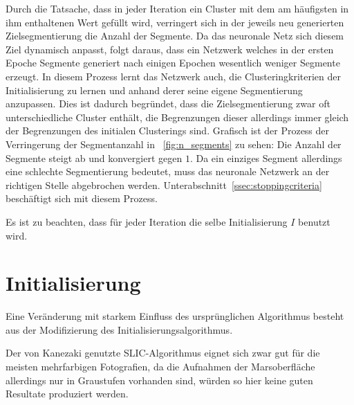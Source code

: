 Durch die Tatsache, dass in jeder Iteration ein Cluster mit dem am häufigsten in ihm enthaltenen Wert gefüllt wird, verringert sich in der jeweils neu generierten Zielsegmentierung die Anzahl der Segmente. Da das neuronale Netz sich diesem Ziel dynamisch anpasst, folgt daraus, dass ein Netzwerk welches in der ersten Epoche  Segmente generiert nach einigen Epochen wesentlich weniger Segmente erzeugt. In diesem Prozess lernt das Netzwerk auch, die Clusteringkriterien der Initialisierung zu lernen und anhand derer seine eigene Segmentierung anzupassen. Dies ist dadurch begründet, dass die Zielsegmentierung zwar oft unterschiedliche Cluster enthält, die Begrenzungen dieser allerdings immer gleich der Begrenzungen des initialen Clusterings sind.
Grafisch ist der Prozess der Verringerung der Segmentanzahl in \figurename~\ref{fig:n_segments} zu sehen: Die Anzahl der Segmente steigt ab und konvergiert gegen $1$. Da ein einziges Segment allerdings eine schlechte Segmentierung bedeutet, muss das neuronale Netzwerk an der richtigen Stelle abgebrochen werden. Unterabschnitt~\ref{ssec:stoppingcriteria} beschäftigt sich mit diesem Prozess.

Es ist zu beachten, dass für jeder Iteration die selbe Initialisierung $I$ benutzt wird.

\section{Initialisierung}
\label{sec:initialization}

Eine Veränderung mit starkem Einfluss des ursprünglichen Algorithmus besteht aus der Modifizierung des Initialisierungsalgorithmus.

Der von Kanezaki \etal genutzte SLIC-Algorithmus eignet sich zwar gut für die meisten mehrfarbigen Fotografien, da die Aufnahmen der Marsoberfläche allerdings nur in Graustufen vorhanden sind, würden so hier keine guten Resultate produziert werden.

